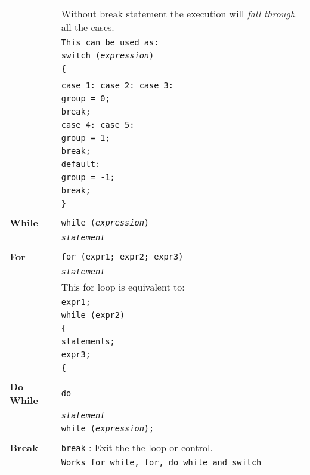 \begin{minipage}{\linewidth}
\begin{tabularx}{\linewidth}{l|X}
    & Without break statement the execution will \textit{fall through} all the cases.\\
    & \texttt{This can be used as:} \\
    & \texttt{switch (\textit{expression})}\\
    & \texttt{\{} \\
    & \hspace{10pt} \\
    & \texttt{\qquad case 1: case 2: case 3:}\\
    & \texttt{\qquad \qquad group = 0;}\\
    & \texttt{\qquad \qquad break;}\\
    & \texttt{\qquad case 4: case 5:}\\
    & \texttt{\qquad \qquad group = 1;}\\
    & \texttt{\qquad \qquad break;}\\
    & \texttt{\qquad default:} \\
    & \texttt{\qquad \qquad group = -1;}\\
    & \texttt{\qquad \qquad break;}\\
    & \texttt{\}}\\
    \hline\\
    \textbf{While} & \texttt{while (\textit{expression})}\\
    & \texttt{\qquad \textit{statement}}\\
    \hline \\
    \textbf{For} & \texttt{for (expr1; expr2; expr3)}\\
    & \texttt{\qquad \textit{statement}} \\
    & This for loop is equivalent to:\\
    & \texttt{expr1;}\\
    & \texttt{while (expr2)} \\
    & \texttt{\{}\\
    & \texttt{\qquad statements;}\\
    & \texttt{\qquad expr3;}\\
    & \texttt{\{}\\
    \hline\\
    \textbf{Do While} & \texttt{do}\\
    & \texttt{\qquad \textit{statement}}\\
    & \texttt{while (\textit{expression});}\\
    \hline\\
    \textbf{Break} & \texttt{break} : Exit the the loop or control.\\
    & \texttt{Works for \texttt{while, for, do while} and \texttt{switch}}\\
    \hline
\end{tabularx}
\end{minipage}

